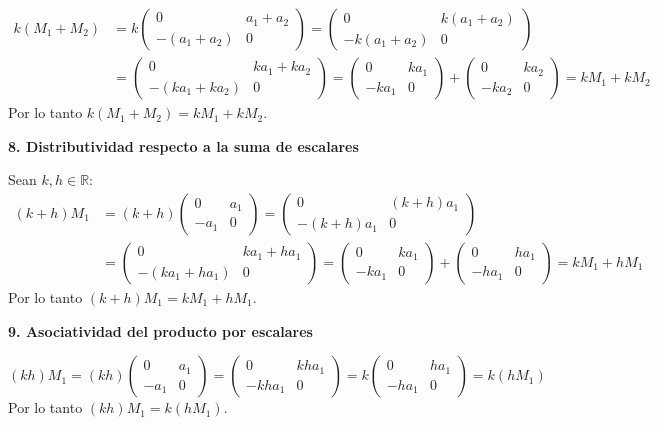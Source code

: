 \documentclass[12pt]{article}
\begin{document}
\begin{enumerate}[label=\alph*.-]
    \begin{align*}
    k(M_1+M_2) &= k\begin{pmatrix}0 & a_1+a_2\\ -(a_1+a_2) & 0\end{pmatrix} = \begin{pmatrix}0 & k(a_1+a_2)\\ -k(a_1+a_2) & 0\end{pmatrix}\\
    &= \begin{pmatrix}0 & ka_1+ka_2\\ -(ka_1+ka_2) & 0\end{pmatrix} = \begin{pmatrix}0 & ka_1\\ -ka_1 & 0\end{pmatrix}+\begin{pmatrix}0 & ka_2\\ -ka_2 & 0\end{pmatrix} = kM_1+kM_2
    \end{align*}
    Por lo tanto $k(M_1+M_2)=kM_1+kM_2$.

    \textbf{8. Distributividad respecto a la suma de escalares}

    Sean $k,h \in \mathbb{R}$:
    \begin{align*}
    (k+h)M_1 &= (k+h)\begin{pmatrix}0 & a_1\\ -a_1 & 0\end{pmatrix} = \begin{pmatrix}0 & (k+h)a_1\\ -(k+h)a_1 & 0\end{pmatrix}\\
    &= \begin{pmatrix}0 & ka_1+ha_1\\ -(ka_1+ha_1) & 0\end{pmatrix} = \begin{pmatrix}0 & ka_1\\ -ka_1 & 0\end{pmatrix}+\begin{pmatrix}0 & ha_1\\ -ha_1 & 0\end{pmatrix} = kM_1+hM_1
    \end{align*}
    Por lo tanto $(k+h)M_1=kM_1+hM_1$.

    \textbf{9. Asociatividad del producto por escalares}

    \[
    (kh)M_1 = (kh)\begin{pmatrix}0 & a_1\\ -a_1 & 0\end{pmatrix} = \begin{pmatrix}0 & kha_1\\ -kha_1 & 0\end{pmatrix} = k\begin{pmatrix}0 & ha_1\\ -ha_1 & 0\end{pmatrix} = k(hM_1)
    \]
    Por lo tanto $(kh)M_1=k(hM_1)$.


\end{enumerate}
\end{document}
